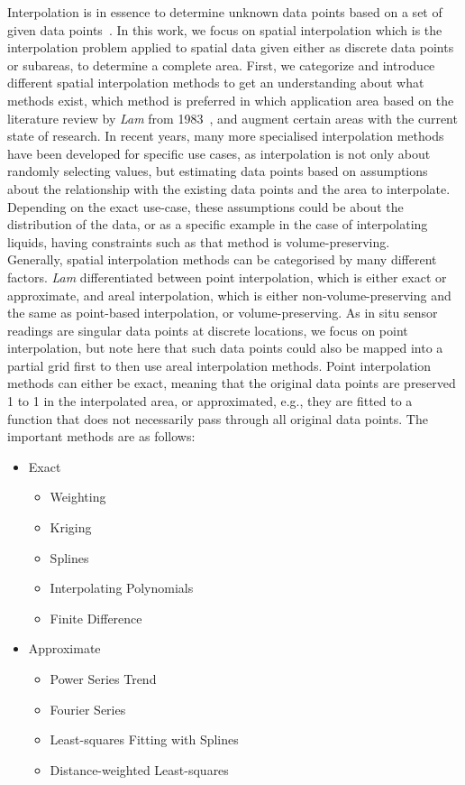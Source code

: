 Interpolation is in essence to determine unknown data points based on a set of given data points~\cite{steffensen1927interpolation}. In this work, we focus on spatial interpolation which is the interpolation problem applied to spatial data given either as discrete data points or subareas, to determine a complete area. First, we categorize and introduce different spatial interpolation methods to get an understanding about what methods exist, which method is preferred in which application area based on the literature review by \textit{Lam} from 1983~\cite{lam1983spatial}, and augment certain areas with the current state of research. In recent years, many more specialised interpolation methods have been developed for specific use cases, as interpolation is not only about randomly selecting values, but estimating data points based on assumptions about the relationship with the existing data points and the area to interpolate. Depending on the exact use-case, these assumptions could be about the distribution of the data, or as a specific example in the case of interpolating liquids, having constraints such as that method is volume-preserving.\\
Generally, spatial interpolation methods can be categorised by many different factors. \textit{Lam} differentiated between point interpolation, which is either exact or approximate, and areal interpolation, which is either non-volume-preserving and the same as point-based interpolation, or volume-preserving. As in situ sensor readings are singular data points at discrete locations, we focus on point interpolation, but note here that such data points could also be mapped into a partial grid first to then use areal interpolation methods.
Point interpolation methods can either be exact, meaning that the original data points are preserved 1 to 1 in the interpolated area, or approximated, e.g., they are fitted to a function that does not necessarily pass through all original data points. The important methods are as follows:

\begin{itemize}
    \item Exact

    \begin{itemize}
        \item Weighting
        \item Kriging
        \item Splines
        \item Interpolating Polynomials
        \item Finite Difference
    \end{itemize}

    \item Approximate

    \begin{itemize}
        \item Power Series Trend
        \item Fourier Series
        \item Least-squares Fitting with Splines
        \item Distance-weighted Least-squares
    \end{itemize}
\end{itemize}

